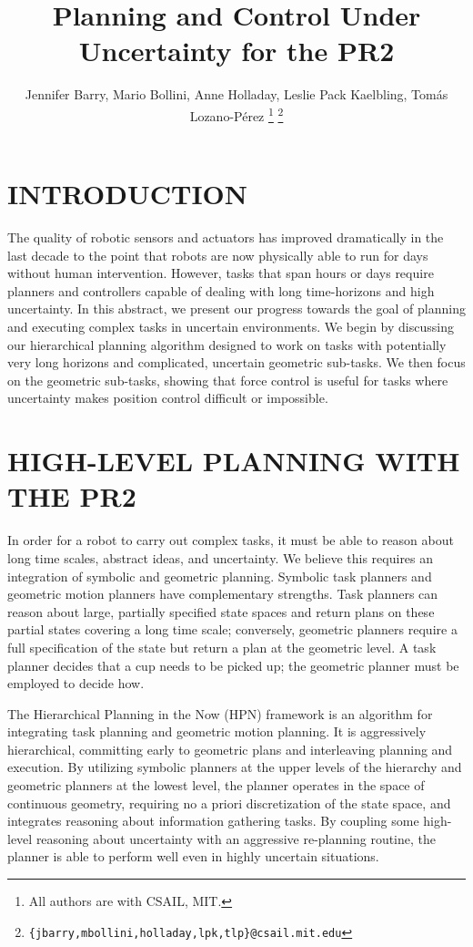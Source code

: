\documentclass[letterpaper, 10 pt, conference]{ieeeconf}  %
\title{\LARGE \bf
Planning and Control Under Uncertainty for the PR2
}
\author{Jennifer Barry, Mario Bollini, Anne Holladay, Leslie Pack
  Kaelbling, Tom\'{a}s Lozano-P\'{e}rez%
\thanks{All authors are with CSAIL,
  MIT.}%
\thanks{{\tt \{jbarry,mbollini,holladay,lpk,tlp\}@csail.mit.edu}}%
}
\begin{document}
\maketitle
\thispagestyle{empty}
\pagestyle{empty}


\section{INTRODUCTION}

The
quality of robotic sensors and actuators has improved dramatically 
in the last decade to the point that robots are now physically able
to run for days without human intervention.  However, tasks that
span hours or days require planners and controllers capable of dealing
with long time-horizons and high uncertainty.
In this abstract, we present our progress towards the goal of planning
and 
executing complex tasks in uncertain
environments.
We begin by discussing our
hierarchical planning algorithm designed to work on tasks with
potentially very long horizons and complicated, uncertain geometric
sub-tasks.  We then focus on the geometric sub-tasks, 
showing that force control is useful for tasks where
uncertainty makes position control difficult or impossible.

\section{HIGH-LEVEL PLANNING WITH THE PR2}

In order for a robot to carry out complex tasks, it must be able to
reason about long time scales, abstract ideas, and uncertainty.   
We believe this requires an integration of symbolic and geometric
planning.  Symbolic task planners and
geometric motion planners have complementary strengths.  Task planners
can reason about large, partially specified state spaces and return
plans on these partial states covering a 
long time scale; conversely, geometric planners require a full
specification of the state but return a plan at the geometric level.
A task planner decides that a cup needs to be picked up; the geometric
planner must be employed to decide how.

The Hierarchical Planning in the Now (HPN) framework is an algorithm
for integrating task planning and geometric motion planning.  It is
aggressively hierarchical, committing early to geometric
plans and interleaving planning and execution.  By utilizing symbolic
planners at the upper levels of the hierarchy and geometric planners
at the lowest level, the planner operates in the space of continuous
geometry, requiring no a priori discretization of the state space, and
integrates reasoning about information gathering tasks.  By coupling
some
high-level reasoning about uncertainty with an aggressive re-planning
routine, the planner is able to perform well even in highly uncertain
situations.
\end{document}
